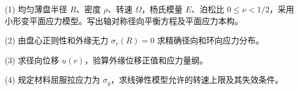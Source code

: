 (1) 均匀薄盘半径 \(R\)、密度 \(\rho\)、转速 \(\Omega\)，杨氏模量 \(E\)、泊松比 \(0\le\nu<1/2\)，采用小形变平面应力模型。写出轴对称径向平衡方程及平面应力本构。

(2) 由盘心正则性和外缘无力 \(\sigma_r(R)=0\) 求精确径向和环向应力分布。

(3) 求径向位移 \(u(r)\)，验算外缘位移正值和应力量纲。

(4) 规定材料屈服拉应力为 \(\sigma_y\)，求线弹性模型允许的转速上限及其失效条件。
